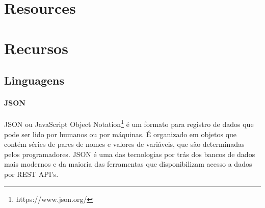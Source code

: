 {\chapter[Appendix A]{Resources}}
{\chapter[Apêndice A]{Recursos}}



 



%
\newpage

\section{Linguagens}





\subsubsection{JSON}
JSON ou JavaScript Object Notation\footnote{https://www.json.org/} é um formato para registro de dados que pode ser lido por humanos ou por máquinas. É organizado em objetos que contém séries de pares de nomes e valores de variáveis, que são determinadas pelos programadores. JSON é uma das tecnologias por trás dos bancos de dados mais modernos e da maioria das ferramentas que disponibilizam acesso a dados por REST API's.


